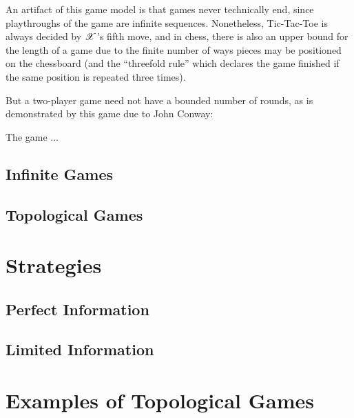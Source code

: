 An artifact of this game model is that games never technically end, since 
playthroughs of the game are infinite sequences. Nonetheless, Tic-Tac-Toe
is always decided by $\mathscr{X}$'s fifth move, and in chess, there is also an
upper bound for the length of a game due to the finite number of ways pieces
may be positioned on the chessboard (and the ``threefold rule''
which declares the game finished if the same position is repeated three times).

But a two-player game need not have a bounded number of rounds, as is
demonstrated by this game due to John Conway:

\begin{game}
  The game ...
\end{game}



\subsection{Infinite Games}

\subsection{Topological Games}


\section{Strategies}

\subsection{Perfect Information}

\subsection{Limited Information}


\section{Examples of Topological Games}